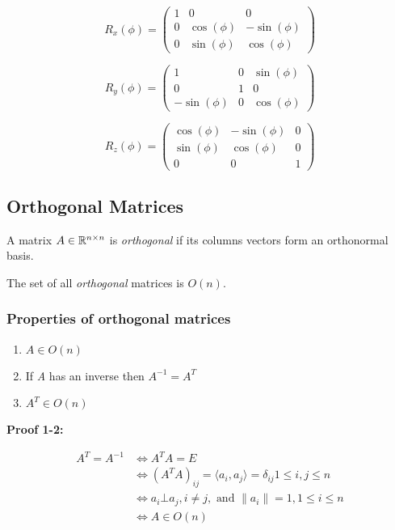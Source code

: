 \[
    R_x (\phi) =
    \begin{pmatrix}
        1 & 0 & 0 \\
        0 & \cos(\phi) & -\sin(\phi) \\
        0 & \sin(\phi) & \cos(\phi)
    \end{pmatrix}
\]

\[
    R_y (\phi) =
    \begin{pmatrix}
        1 & 0 & \sin(\phi) \\
        0 & 1 & 0 \\
        -\sin(\phi) & 0 & \cos(\phi)
    \end{pmatrix}
\]

\[
    R_z (\phi) =
    \begin{pmatrix}
        \cos(\phi) & -\sin(\phi) & 0 \\
        \sin(\phi) & \cos(\phi) & 0 \\
        0 & 0 & 1
    \end{pmatrix}
\]


\subsection{Orthogonal Matrices}

A matrix \(A \in \mathbb{R}^{n \times n}\) is \emph{orthogonal} if its columns vectors form an orthonormal 
basis.
\vspace{\baselineskip}

The set of all \emph{orthogonal} matrices is \(O(n)\).

\subsubsection{Properties of orthogonal matrices}

\begin{enumerate}
    \item \(A \in O(n)\)
    \item If \emph{A} has an inverse then \(A^{-1} = A^T\)
    \item \(A^T \in O(n)\)
\end{enumerate}

\textbf{Proof 1-2:}

\begin{align*}
    A^T = A^{-1} &\iff A^T A = E\\
                 &\iff (A^T A)_{ij} = \langle a_i, a_j\rangle = \delta_{ij} 1 \le i,j \le n\\
                 &\iff a_i \bot a_j, i \ne j, \text{ and } \|a_i\| = 1, 1 \le i \le n\\
                 &\iff A \in O(n)
\end{align*}

